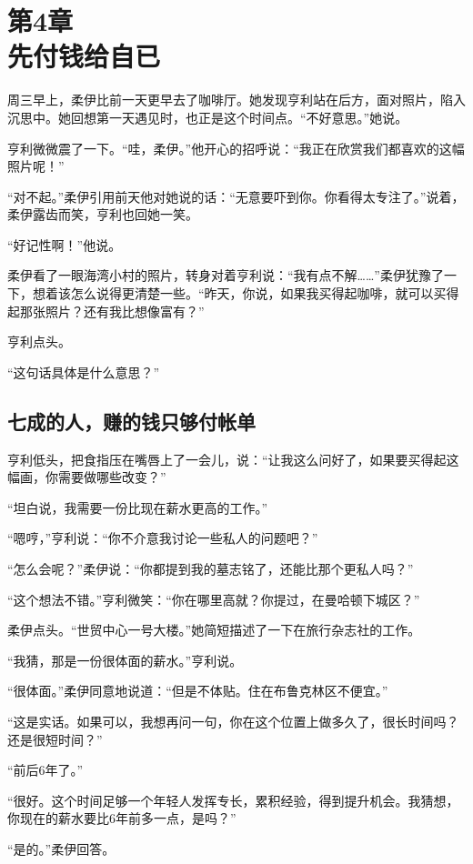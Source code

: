 \section[第4章\q 先付钱给自已]{第4章\\ 先付钱给自已}
\label{sec:ch4}

周三早上，柔伊比前一天更早去了咖啡厅。她发现亨利站在后方，面对照片，陷入沉思中。她回想第一天遇见时，也正是这个时间点。“不好意思。”她说。

亨利微微震了一下。“哇，柔伊。”他开心的招呼说：“我正在欣赏我们都喜欢的这幅照片呢！”

“对不起。”柔伊引用前天他对她说的话：“无意要吓到你。你看得太专注了。”说着，柔伊露齿而笑，亨利也回她一笑。

“好记性啊！”他说。

柔伊看了一眼海湾小村的照片，转身对着亨利说：“我有点不解……”柔伊犹豫了一下，想着该怎么说得更清楚一些。“昨天，你说，如果我买得起咖啡，就可以买得起那张照片？还有我比想像富有？”

亨利点头。

“这句话具体是什么意思？”

\subsection{七成的人，赚的钱只够付帐单}

亨利低头，把食指压在嘴唇上了一会儿，说：“让我这么问好了，如果要买得起这幅画，你需要做哪些改变？”

“坦白说，我需要一份比现在薪水更高的工作。”

“嗯哼，”亨利说：“你不介意我讨论一些私人的问题吧？”

“怎么会呢？”柔伊说：“你都提到我的墓志铭了，还能比那个更私人吗？”

“这个想法不错。”亨利微笑：“你在哪里高就？你提过，在曼哈顿下城区？”

柔伊点头。“世贸中心一号大楼。”她简短描述了一下在旅行杂志社的工作。

“我猜，那是一份很体面的薪水。”亨利说。

“很体面。”柔伊同意地说道：“但是不体贴。住在布鲁克林区不便宜。”

“这是实话。如果可以，我想再问一句，你在这个位置上做多久了，很长时间吗？还是很短时间？”

“前后6年了。”

“很好。这个时间足够一个年轻人发挥专长，累积经验，得到提升机会。我猜想，你现在的薪水要比6年前多一点，是吗？”

“是的。”柔伊回答。

